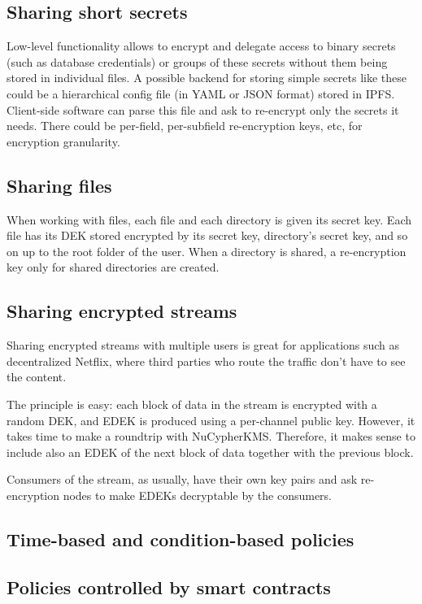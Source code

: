 \documentclass[notitlepage,longbibliography]{revtex4-1}
\newcommand{\kms}{NuCypherKMS}
\begin{document}
\subsection{Sharing short secrets}

Low-level functionality allows to encrypt and delegate access to binary secrets (such as database credentials) or groups of these secrets without them
being stored in individual files.
A possible backend for storing simple secrets like these could be a hierarchical config file (in YAML or JSON format) stored in IPFS.
Client-side software can parse this file and ask to re-encrypt only the secrets it needs.
There could be per-field, per-subfield re-encryption keys, etc, for encryption granularity.

\subsection{Sharing files}

When working with files, each file and each directory is given its secret key.
Each file has its DEK stored encrypted by its secret key, directory's secret key, and so on up to the root folder of the user.
When a directory is shared, a re-encryption key only for shared directories are created.

\subsection{Sharing encrypted streams}

Sharing encrypted streams with multiple users is great for applications such as decentralized Netflix, where third parties who route the traffic don't have
to see the content.

The principle is easy: each block of data in the stream is encrypted with a random DEK, and EDEK is produced using a per-channel public key.
However, it takes time to make a roundtrip with \kms.
Therefore, it makes sense to include also an EDEK of the next block of data together with the previous block.

Consumers of the stream, as usually, have their own key pairs and ask re-encryption nodes to make EDEKs decryptable by the consumers.

\subsection{Time-based and condition-based policies}

\subsection{Policies controlled by smart contracts}
\end{document}
